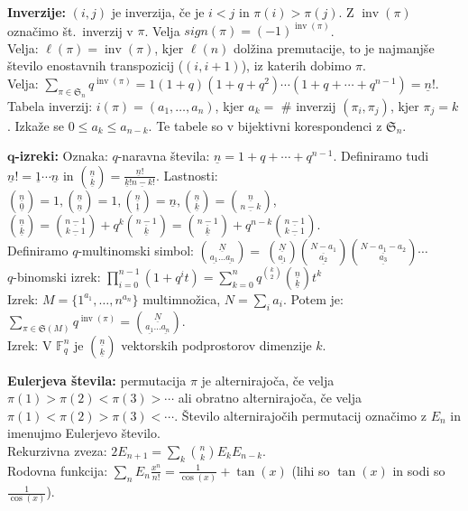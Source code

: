\documentclass[a4paper, oneside, 12pt]{article}
\theoremstyle{definition}
\newcommand{\per}{\mathfrak{S}}
\DeclareMathOperator{\inv}{inv}
\newcommand{\q}[1]{\underline{#1}}
\begin{document}
\textbf{Inverzije:} $(i, j)$ je inverzija, če je $i < j$ in $\pi(i) > \pi(j)$.
Z $\inv(\pi)$ označimo št.~inverzij v $\pi$. Velja $sign(\pi) = (-1)^{\inv(\pi)}$.\\
Velja: $\ell(\pi) = \inv(\pi)$, kjer $\ell(n)$ dolžina premutacije, to je najmanjše število
enostavnih transpozicij ($(i, i+1)$), iz katerih dobimo $\pi$.\\
Velja: $\sum_{\pi \in \per_n} q^{\inv(\pi)} = 1(1+q)(1+q+q^2) \cdots (1+q+ \cdots + q^{n-1}) = \q{n}!$. \\
Tabela inverzij: $i(\pi) = (a_1, \ldots, a_n)$, kjer $a_k =$ \# inverzij
$(\pi_i, \pi_j)$, kjer $\pi_j = k$. Izkaže se $0 \leq a_k \leq a_{n-k}$. Te
tabele so v bijektivni korespondenci z $\per_n$.

\textbf{$\boldsymbol q$-izreki:}
Oznaka: $q$-naravna števila: $\q{n} = 1 + q + \cdots + q^{n-1}$. Definiramo tudi
$\q{n}! = \q{1}\cdots\q{n}$ in $\binom{\q{n}}{\q{k}} = \frac{\q{n}!}{\q{k}!\q{n-k}!}$.
Lastnosti: $\binom{\q{n}}{\q{0}} = 1, \binom{\q{n}}{\q{n}} = 1, \binom{\q{n}}{\q{1}} = \q{n},
\binom{\q{n}}{\q{k}} = \binom{\q{n}}{\q{n-k}}$,\\ $\binom{\q{n}}{\q{k}} =
\binom{\q{n-1}}{\q{k-1}} + q^k\binom{\q{n-1}}{\q{k}} = \binom{\q{n-1}}{\q{k}} + q^{n-k} \binom{\q{n-1}}{\q{k-1}}$. \\
Definiramo $q$-multinomski simbol: $\binom{\q{N}}{\q{a_1}\ldots\q{a_n}} =\
  \binom{\q{N}}{\q{a_1}}\binom{\q{N-a_1}}{\q{a_2}}\binom{\q{N-a_1-a_2}}{\q{a_3}}\cdots$ \\
$q$-binomski izrek: $\prod_{i=0}^{n-1}(1+q^i t) = \sum_{k=0}^n q^{\binom{k}{2}} \binom{\q{n}}{\q{k}} t^k$ \\
Izrek: $M = \{ 1^{a_1}, \ldots, n^{a_n}\}$ multimnožica, $N = \sum_i a_i$.
Potem je: $\sum_{\pi \in \per(M)} q^{\inv(\pi)} = \binom{\q{N}}{\q{a_1}\ldots \q{a_n}}$. \\
Izrek: V $\mathbb{F}_q^n$ je $\binom{\q{n}}{\q{k}}$ vektorskih podprostorov dimenzije $k$.

\textbf{Eulerjeva števila:} permutacija $\pi$ je alternirajoča, če velja
$\pi(1) > \pi(2) < \pi(3) > \cdots$ ali obratno alternirajoča, če velja $\pi(1) < \pi(2) > \pi(3) < \cdots$.
Število alternirajočih permutacij označimo z $E_n$ in imenujmo Eulerjevo število.  \\
Rekurzivna zveza: $2E_{n+1} = \sum_k \binom{n}{k} E_kE_{n-k}$. \\
Rodovna funkcija: $\sum_n E_n \frac{x^n}{n!} = \frac{1}{\cos(x)} + \tan(x)$ (lihi so $\tan(x)$ in sodi so $\frac{1}{\cos(x)}$).
\end{document}
